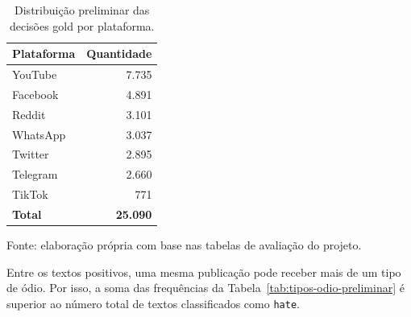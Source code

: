 \begin{table}[htbp]
    \centering
    \caption{Distribuição preliminar das decisões gold por plataforma.}
    \label{tab:distribuicao-plataforma}
    \begin{tabular}{lr}
        \toprule
        \textbf{Plataforma} & \textbf{Quantidade} \\
        \midrule
        YouTube & 7.735 \\
        Facebook & 4.891 \\
        Reddit & 3.101 \\
        WhatsApp & 3.037 \\
        Twitter & 2.895 \\
        Telegram & 2.660 \\
        TikTok & 771 \\
        \midrule
        \textbf{Total} & \textbf{25.090} \\
        \bottomrule
    \end{tabular}
    \par\smallskip
    {\footnotesize Fonte: elaboração própria com base nas tabelas de avaliação
    do projeto.\par}
\end{table}

Entre os textos positivos, uma mesma publicação pode receber mais de um tipo de
ódio. Por isso, a soma das frequências da Tabela~\ref{tab:tipos-odio-preliminar}
é superior ao número total de textos classificados como \texttt{hate}.

